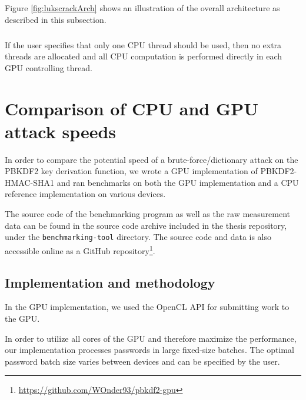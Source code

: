 \documentclass[12pt,oneside]{fithesis2}
\begin{document}
      Figure \ref{fig:lukscrackArch} shows an illustration of the overall architecture as described in this subsection.
      
      \paragraph*{}
      If the user specifies that only one CPU thread should be used, then no extra threads are allocated and all CPU computation is performed directly in each GPU controlling thread.
      
    \chapter{Comparison of CPU and GPU attack speeds}
      In order to compare the potential speed of a brute-force/dictionary attack on the PBKDF2 key derivation function, we wrote a GPU implementation of PBKDF2-HMAC-SHA1 and ran benchmarks on both the GPU implementation and a CPU reference implementation on various devices.
      
      The source code of the benchmarking program as well as the raw measurement data can be found in the source code archive included in the thesis repository, under the \texttt{benchmarking-tool} directory. The source code and data is also accessible online as a GitHub repository\footnote{\url{https://github.com/WOnder93/pbkdf2-gpu}}.
      
      \section{Implementation and methodology}
      In the GPU implementation, we used the OpenCL API for submitting work to the GPU.
      
      In order to utilize all cores of the GPU and therefore maximize the performance, our implementation processes passwords in large fixed-size batches. The optimal password batch size varies between devices and can be specified by the user.
      
\end{document}

